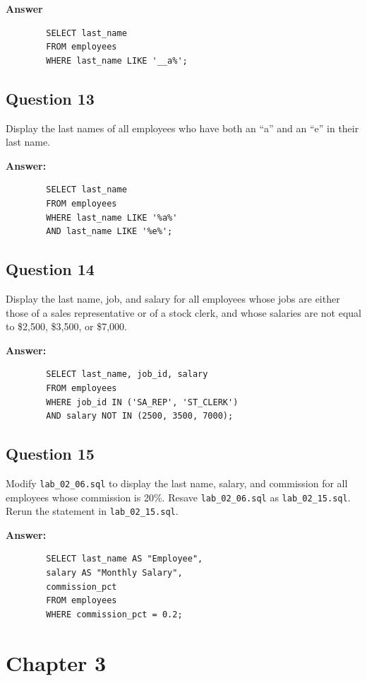 \documentclass[12pt,a4paper]{article}
\begin{document}
\textbf{Answer}
    \begin{lstlisting}
        SELECT last_name
        FROM employees
        WHERE last_name LIKE '__a%';
    \end{lstlisting}

\subsection*{Question 13}
Display the last names of all employees who have both an “a” and an “e” in their last name.

\textbf{Answer:}
    \begin{lstlisting}
        SELECT last_name
        FROM employees
        WHERE last_name LIKE '%a%'
        AND last_name LIKE '%e%';
    \end{lstlisting}

\subsection*{Question 14}
Display the last name, job, and salary for all employees whose jobs are either those of a sales 
representative or of a stock clerk, and whose salaries are not equal to \$2,500, \$3,500, or \$7,000.

\textbf{Answer:}
    \begin{lstlisting}
        SELECT last_name, job_id, salary
        FROM employees
        WHERE job_id IN ('SA_REP', 'ST_CLERK')
        AND salary NOT IN (2500, 3500, 7000);
    \end{lstlisting}

\subsection*{Question 15}
Modify \texttt{lab\_02\_06.sql} to display the last name, salary, and commission for all employees 
whose commission is 20\%. Resave \texttt{lab\_02\_06.sql} as \texttt{lab\_02\_15.sql}. Rerun the 
statement in \texttt{lab\_02\_15.sql}.

\textbf{Answer:}
    \begin{lstlisting}
        SELECT last_name AS "Employee",
        salary AS "Monthly Salary",
        commission_pct
        FROM employees
        WHERE commission_pct = 0.2;
    \end{lstlisting}

\section*{Chapter 3}
\end{document}
